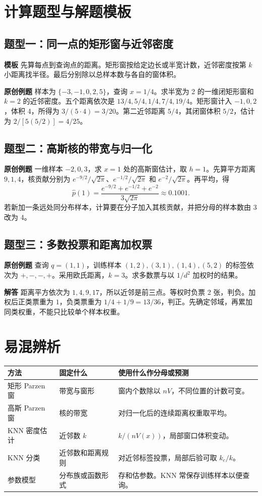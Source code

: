 \documentclass[UTF8,a4paper,zihao=-4,fontset=fandol]{ctexrep}
\begin{document}
\section{计算题型与解题模板}
\subsection*{题型一：同一点的矩形窗与近邻密度}
\textbf{模板} 先算每点到查询点的距离。矩形窗按给定边长或半宽计数，近邻密度按第 $k$ 小距离找半径。最后分别除以总样本数与各自的窗体积。

\textbf{原创例题} 样本为 $\{-3,-1,0,2,5\}$，查询 $x=1/4$。求半宽为 2 的一维闭矩形窗和 $k=2$ 的近邻密度。五个距离依次是 $13/4,5/4,1/4,7/4,19/4$。矩形窗计入 $-1,0,2$，体积 4，所得为 $3/(5\cdot4)=3/20$。第二近邻距离 $5/4$，其闭窗体积 $5/2$，估计为 $2/[5(5/2)]=4/25$。

\subsection*{题型二：高斯核的带宽与归一化}
\textbf{原创例题} 一维样本 $-2,0,3$，求 $x=1$ 处的高斯窗估计，取 $h=1$。先算平方距离 $9,1,4$，核贡献分别为 $e^{-9/2}/\sqrt{2\pi}$、$e^{-1/2}/\sqrt{2\pi}$ 和 $e^{-2}/\sqrt{2\pi}$。再平均，得
\[
 \widehat p(1)=\frac{e^{-9/2}+e^{-1/2}+e^{-2}}{3\sqrt{2\pi}}
 \approx0.1001.
\]
若新加一条远处同分布样本，计算要在分子加入其核贡献，并把分母的样本数由 3 改为 4。

\subsection*{题型三：多数投票和距离加权票}
\textbf{原创例题} 查询 $q=(1,1)$，训练样本 $(1,2),(3,1),(1,4),(5,2)$ 的标签依次为 $+,-,-,+$。采用欧氏距离，$k=3$。求多数票与以 $1/d^2$ 加权时的结果。

\textbf{解答} 距离平方依次为 $1,4,9,17$，所以近邻是前三点。等权时负票 2 张，判负。加权后正类票重为 $1$，负类票重为 $1/4+1/9=13/36$，判正。先确定邻域，再累加同类权重，不能只比较单个样本权重。

\section{易混辨析}
\noindent\begin{tabularx}{\linewidth}{@{}l>{\raggedright\arraybackslash}X>{\raggedright\arraybackslash}X@{}}
\toprule
方法 & 固定什么 & 使用什么作分母或预测\\
\midrule
矩形 Parzen 窗 & 带宽与窗形 & 窗内个数除以 $nV$，不同位置的计数可变。\\
高斯 Parzen 窗 & 核的带宽 & 对归一化后的连续距离权重取平均。\\
KNN 密度估计 & 近邻数 $k$ & $k/(nV(x))$，局部窗口体积变动。\\
KNN 分类 & 近邻数和距离规则 & 对近邻标签投票，局部后验可取 $k_c/k$。\\
参数模型 & 分布族或函数形式 & 存和估参数。KNN 常保存训练样本以便查询。\\
\bottomrule
\end{tabularx}
\end{document}

